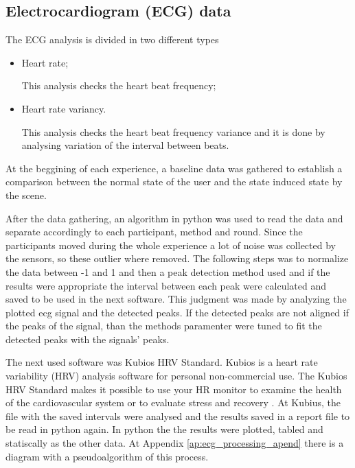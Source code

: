 \subsection{Electrocardiogram (ECG) data}
\label{subsec:results_ecg}

The ECG analysis is divided in two different types

\begin{itemize}
    \item Heart rate;
    
        This analysis checks the heart beat frequency;

    \item Heart rate variancy.
    
        This analysis checks the heart beat frequency variance and it is done by analysing variation of the interval between beats.

\end{itemize}

At the beggining of each experience, a baseline data was gathered to establish a comparison between the normal state of the user and the state induced state by the scene.

After the data gathering, an algorithm in python was used to read the data and separate accordingly to each participant, method and round. Since the participants moved during the whole experience a lot of noise was collected by the sensors, so these outlier where removed. The following steps was to normalize the data between -1 and 1 and then a peak detection method used and if the results were appropriate the interval between each peak were calculated and saved to be used in the next software. This judgment was made by analyzing the plotted ecg signal and the detected peaks. If the detected peaks are not aligned if the peaks of the signal, than the methods paramenter were tuned to fit the detected peaks with the signals' peaks.

The next used software was Kubios HRV Standard. Kubios is a heart rate variability (HRV) analysis software for personal non-commercial use. The Kubios HRV Standard makes it possible to use your HR monitor to examine the health of the cardiovascular system or to evaluate stress and recovery \cite{kubios}. At Kubius, the file with the saved intervals were analysed and the results saved in a report file to be read in python again. In python the the results were plotted, tabled and statiscally as the other data. At Appendix \ref{ap:ecg_processing_apend} there is a diagram with a pseudoalgorithm of this process.

